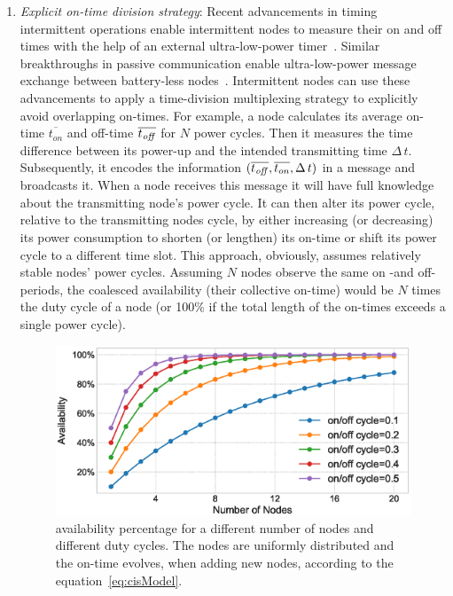 \begin{enumerate}[label=\roman*.]%
%
		\item \textit{Explicit on-time division strategy}: Recent advancements in timing intermittent operations enable intermittent nodes to measure their on and off times with the help of an external ultra-low-power timer~\cite{hester2017timely}. Similar breakthroughs in passive communication enable ultra-low-power message exchange between battery-less nodes~\cite{li2015retro}. Intermittent nodes can use these advancements to apply a time-division multiplexing strategy to explicitly avoid overlapping on-times. For example, a node calculates its average on-time $\overline{t_{on}}$ and off-time $\overline{t_{\it off}}$ for $N$ power cycles. Then it measures the time difference between its power-up and the intended transmitting time $\Delta\,t$. Subsequently, it encodes the information $({\overline{t_{\it off}}, \overline{t_{on}}, \Delta\,t})$ in a message and broadcasts it. When a node receives this message it will have full knowledge about the transmitting node's power cycle. It can then alter its power cycle, relative to the transmitting nodes cycle, by either increasing (or decreasing) its power consumption to shorten (or lengthen) its on-time or shift its power cycle to a different time slot. This approach, obviously, assumes relatively stable nodes' power cycles. Assuming $N$ nodes observe the same on -and off- periods, the coalesced availability (their collective on-time) would be $N$ times the duty cycle of a node (or 100\% if the total length of the on-times exceeds a single power cycle).
%
\begin{figure}
		\centering
		\includegraphics[width=\columnwidth]{figures/cisModel}
		\caption{\fullsys availability percentage for a different number of nodes and different duty cycles. The nodes are uniformly distributed and the \sys on-time evolves, when adding new nodes, according to the equation~\ref{eq:cisModel}.}

\end{figure}
\end{enumerate}
